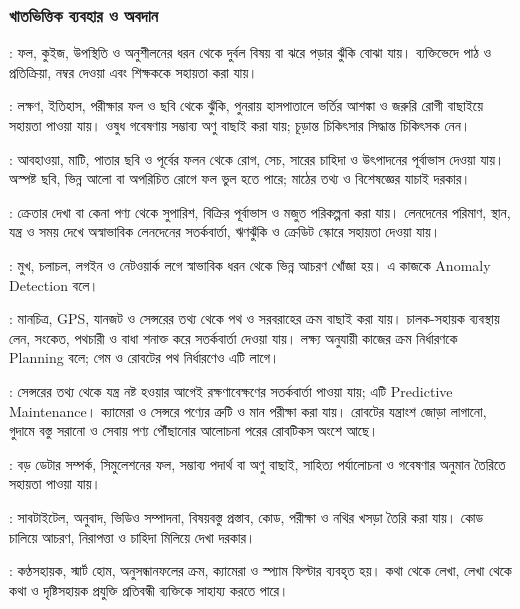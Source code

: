 \begin{topicbody}
\subsubsection{খাতভিত্তিক ব্যবহার ও অবদান}
\begin{compactpoints}
\item {}: ফল, কুইজ, উপস্থিতি ও অনুশীলনের ধরন থেকে দুর্বল বিষয় বা ঝরে পড়ার ঝুঁকি বোঝা যায়। ব্যক্তিভেদে পাঠ ও প্রতিক্রিয়া, নম্বর দেওয়া এবং শিক্ষককে সহায়তা করা যায়।
\item {}: লক্ষণ, ইতিহাস, পরীক্ষার ফল ও ছবি থেকে ঝুঁকি, পুনরায় হাসপাতালে ভর্তির আশঙ্কা ও জরুরি রোগী বাছাইয়ে সহায়তা পাওয়া যায়। ওষুধ গবেষণায় সম্ভাব্য অণু বাছাই করা যায়; চূড়ান্ত চিকিৎসার সিদ্ধান্ত চিকিৎসক নেন।
\item {}: আবহাওয়া, মাটি, পাতার ছবি ও পূর্বের ফলন থেকে রোগ, সেচ, সারের চাহিদা ও উৎপাদনের পূর্বাভাস দেওয়া যায়। অস্পষ্ট ছবি, ভিন্ন আলো বা অপরিচিত রোগে ফল ভুল হতে পারে; মাঠের তথ্য ও বিশেষজ্ঞের যাচাই দরকার।
\item {}: ক্রেতার দেখা বা কেনা পণ্য থেকে সুপারিশ, বিক্রির পূর্বাভাস ও মজুত পরিকল্পনা করা যায়। লেনদেনের পরিমাণ, স্থান, যন্ত্র ও সময় দেখে অস্বাভাবিক লেনদেনের সতর্কবার্তা, ঋণঝুঁকি ও ক্রেডিট স্কোরে সহায়তা দেওয়া যায়।
\item {}: মুখ, চলাচল, লগইন ও নেটওয়ার্ক লগে স্বাভাবিক ধরন থেকে ভিন্ন আচরণ খোঁজা হয়। এ কাজকে Anomaly Detection বলে।
\item {}: মানচিত্র, GPS, যানজট ও সেন্সরের তথ্য থেকে পথ ও সরবরাহের ক্রম বাছাই করা যায়। চালক-সহায়ক ব্যবস্থায় লেন, সংকেত, পথচারী ও বাধা শনাক্ত করে সতর্কবার্তা দেওয়া যায়। লক্ষ্য অনুযায়ী কাজের ক্রম নির্ধারণকে Planning বলে; গেম ও রোবটের পথ নির্ধারণেও এটি লাগে।
\item {}: সেন্সরের তথ্য থেকে যন্ত্র নষ্ট হওয়ার আগেই রক্ষণাবেক্ষণের সতর্কবার্তা পাওয়া যায়; এটি Predictive Maintenance। ক্যামেরা ও সেন্সরে পণ্যের ত্রুটি ও মান পরীক্ষা করা যায়। রোবটের যন্ত্রাংশ জোড়া লাগানো, গুদামে বস্তু সরানো ও সেবায় পণ্য পৌঁছানোর আলোচনা পরের রোবটিকস অংশে আছে।
\item {}: বড় ডেটার সম্পর্ক, সিমুলেশনের ফল, সম্ভাব্য পদার্থ বা অণু বাছাই, সাহিত্য পর্যালোচনা ও গবেষণার অনুমান তৈরিতে সহায়তা পাওয়া যায়।
\item {}: সাবটাইটেল, অনুবাদ, ভিডিও সম্পাদনা, বিষয়বস্তু প্রস্তাব, কোড, পরীক্ষা ও নথির খসড়া তৈরি করা যায়। কোড চালিয়ে আচরণ, নিরাপত্তা ও চাহিদা মিলিয়ে দেখা দরকার।
\item {}: কণ্ঠসহায়ক, স্মার্ট হোম, অনুসন্ধানফলের ক্রম, ক্যামেরা ও স্প্যাম ফিল্টার ব্যবহৃত হয়। কথা থেকে লেখা, লেখা থেকে কথা ও দৃষ্টিসহায়ক প্রযুক্তি প্রতিবন্ধী ব্যক্তিকে সাহায্য করতে পারে।

\end{compactpoints}
\end{topicbody}
